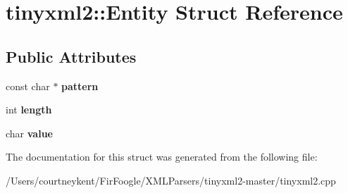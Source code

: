 \hypertarget{structtinyxml2_1_1_entity}{\section{tinyxml2\+:\+:Entity Struct Reference}
\label{structtinyxml2_1_1_entity}
}
\subsection*{Public Attributes}
\begin{DoxyCompactItemize}
\item 
\hypertarget{structtinyxml2_1_1_entity_ab330f5d665d29bfc811ecfa76315894b}{const char $\ast$ {\bfseries pattern}}\label{structtinyxml2_1_1_entity_ab330f5d665d29bfc811ecfa76315894b}

\item 
\hypertarget{structtinyxml2_1_1_entity_a25e2b57cb59cb4fa68f283d7cb570f21}{int {\bfseries length}}\label{structtinyxml2_1_1_entity_a25e2b57cb59cb4fa68f283d7cb570f21}

\item 
\hypertarget{structtinyxml2_1_1_entity_a7334e81e33b4615655a403711b24f3ed}{char {\bfseries value}}\label{structtinyxml2_1_1_entity_a7334e81e33b4615655a403711b24f3ed}

\end{DoxyCompactItemize}


The documentation for this struct was generated from the following file\+:\begin{DoxyCompactItemize}
\item 
/\+Users/courtneykent/\+Fir\+Foogle/\+X\+M\+L\+Parsers/tinyxml2-\/master/tinyxml2.\+cpp\end{DoxyCompactItemize}

